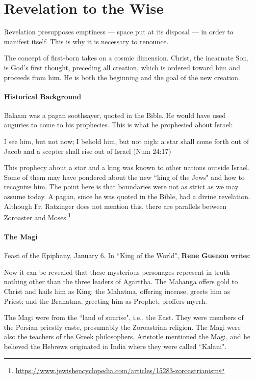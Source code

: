\section{Revelation to the Wise}

\begin{quotex}
Revelation presupposes emptiness — space put at its disposal — in order to manifest itself. This is why it is necessary to renounce. 

The concept of first-born takes on a cosmic dimension. Christ, the incarnate Son, is God's first thought, preceding all creation, which is ordered toward him and proceeds from him. He is both the beginning and the goal of the new creation. 

\end{quotex}
\paragraph{Historical Background}
Balaam was a pagan soothsayer, quoted in the Bible. He would have used auguries to come to his prophecies. This is what he prophesied about Israel:

\begin{quotex}
I see him, but not now; I behold him, but not nigh: a star shall come forth out of Jacob and a scepter shall rise out of Israel (Num 24:17) 

\end{quotex}
This prophecy about a star and a king was known to other nations outside Israel. Some of them may have pondered about the new ``king of the Jews" and how to recognize him. The point here is that boundaries were not as strict as we may assume today. A pagan, since he was quoted in the Bible, had a divine revelation. Although Fr. Ratzinger does not mention this, there are parallels between Zoroaster and Moses.\footnote{\url{https://www.jewishencyclopedia.com/articles/15283-zoroastrianism}}

\paragraph{The Magi}
Feast of the Epiphany, January 6. In ``King of the World", \textbf{Rene Guenon} writes:

\begin{quotex}
Now it can be revealed that these mysterious personages represent in truth nothing other than the three leaders of Agarttha. The Mahanga offers gold to Christ and hails him as King; the Mahatma, offering incense, greets him as Priest; and the Brahatma, greeting him as Prophet, proffers myrrh. 

\end{quotex}
The Magi were from the ``land of sunrise", i.e., the East. They were members of the Persian priestly caste, presumably the Zoroastrian religion. The Magi were also the teachers of the Greek philosophers. Aristotle mentioned the Magi, and he believed the Hebrews originated in India where they were called ``Kalani".

